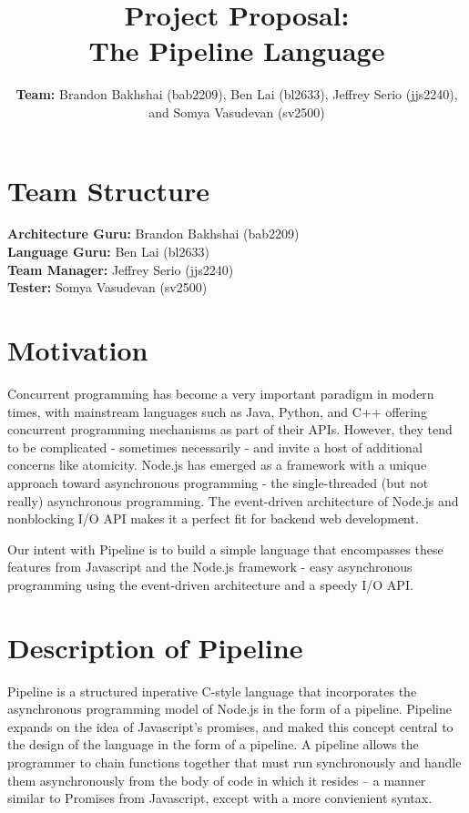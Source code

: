 \documentclass[11pt]{article}
\title{\textbf{Project Proposal:\\ The Pipeline Language}}
\author{\textbf{Team:} Brandon Bakhshai (bab2209), Ben Lai (bl2633), Jeffrey Serio (jjs2240),\\ and Somya Vasudevan (sv2500)}%
\begin{document}
\maketitle
\thispagestyle{empty}
\renewcommand{\thesubsubsection}{\thesubsection.\alph{subsubsection}.}

\section{Team Structure}
\textbf{Architecture Guru:} Brandon Bakhshai (bab2209)\\
\textbf{Language Guru:} Ben Lai (bl2633)\\
\textbf{Team Manager:} Jeffrey Serio (jjs2240)\\
\textbf{Tester:} Somya Vasudevan (sv2500)

\section{Motivation}
\hspace{0.5cm} Concurrent programming has become a very important paradigm in 
modern times, with mainstream languages such as Java, Python, and C++ offering 
concurrent programming mechanisms as part of their APIs. However, they tend to 
be complicated - sometimes necessarily - and invite a host of additional 
concerns like atomicity. Node.js has emerged as a framework with a unique approach toward asynchronous 
programming - the single-threaded (but not really) asynchronous programming. 
The event-driven architecture of Node.js and nonblocking I/O API makes it a 
perfect fit for backend web development.

Our intent with Pipeline is to build a simple language that encompasses these features from 
Javascript and the Node.js framework - easy asynchronous programming using the 
event-driven architecture and a speedy I/O API.

\section{Description of Pipeline}
\hspace{0.5cm} Pipeline is a structured inperative C-style language that incorporates the asynchronous programming model of Node.js in the form of a pipeline. Pipeline expands on the idea of Javascript's promises, and maked this concept central to the design of the language in the form of a pipeline. A pipeline allows the programmer to chain functions together that must run synchronously and handle them asynchronously from the body of code in which it resides -- a manner similar to Promises from Javascript, except with a more convienient syntax. 
\end{document}
